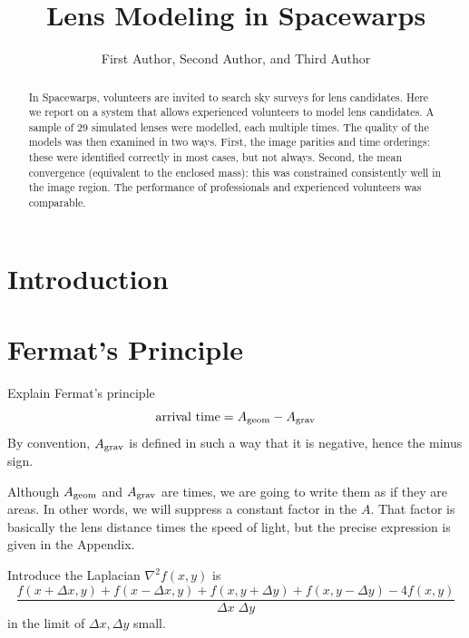 \documentclass[12pt,preprint]{aastex}
\begin{document}
\title{Lens Modeling in Spacewarps}

\author{First Author,
Second Author, and
Third Author}

\begin{abstract}
In Spacewarps, volunteers are invited to search sky surveys for lens
candidates.  Here we report on a system that allows experienced
volunteers to model lens candidates.  A sample of 29 simulated lenses
were modelled, each multiple times.  The quality of the models was
then examined in two ways.  First, the image parities and time
orderings: these were identified correctly in most cases, but not
always.  Second, the mean convergence (equivalent to the enclosed
mass): this was constrained consistently well in the image region.
The performance of professionals and experienced volunteers was
comparable.
\end{abstract}

\keywords{}

\section{Introduction}

\section{Fermat's Principle}

Explain Fermat's principle
\begin{equation}
\hbox{arrival time} = A_{\rm geom} - A_{\rm grav}
\end{equation}
By convention, $A_{\rm grav}$ is defined in such a way that it is
negative, hence the minus sign.

Although $A_{\rm geom}$ and $A_{\rm grav}$ are times, we are going to
write them as if they are areas.  In other words, we will suppress a
constant factor in the $A$.  That factor is basically the lens
distance times the speed of light, but the precise expression is given
in the Appendix.

Introduce the Laplacian $\nabla^2 f(x,y)$ is
\begin{equation}
 \frac{ f(x+\Delta x, y) + f(x-\Delta x, y) +
        f(x, y+\Delta y) + f(x, y-\Delta y) - 4 f(x,y) }
      {\Delta x \; \Delta y}
\end{equation}
in the limit of $\Delta x,\Delta y$ small.
\end{document}
